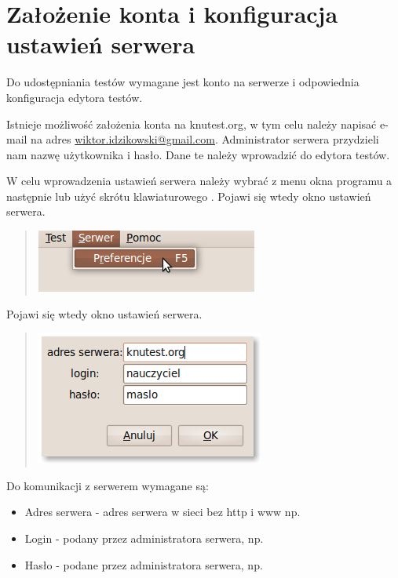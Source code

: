 \documentclass[letterpaper,10pt,polish]{sphinxmanual}
\begin{document}
\section{Założenie konta i konfiguracja ustawień serwera}
\label{index:zalozenie-konta-i-konfiguracja-ustawien-serwera}\label{index:zalozenie-konta}
Do udostępniania testów wymagane jest konto na serwerze i odpowiednia konfiguracja edytora testów.

Istnieje możliwość założenia konta na knutest.org, w tym celu należy napisać e-mail na adres \href{mailto:wiktor.idzikowski@gmail.com}{wiktor.idzikowski@gmail.com}. Administrator serwera przydzieli nam nazwę użytkownika i hasło. Dane te należy wprowadzić do edytora testów.

W celu wprowadzenia ustawień serwera należy wybrać z menu okna programu  a następnie  lub użyć skrótu klawiaturowego . Pojawi się wtedy okno ustawień serwera.
\begin{quote}

\includegraphics{UstawieniaSerwera.png}
\end{quote}

Pojawi się wtedy okno ustawień serwera.
\begin{quote}

\includegraphics{OknoUstawienSerwera.png}
\end{quote}

Do komunikacji z serwerem wymagane są:
\begin{itemize}
\item {} 
Adres serwera - adres serwera w sieci bez http i www np. 

\item {} 
Login - podany przez administratora serwera, np. 

\item {} 
Hasło - podane przez administratora serwera, np. 

\end{itemize}
\end{document}
